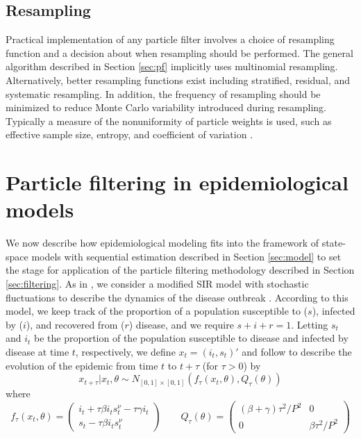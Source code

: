 \documentclass[useAMS,referee,usenatbib]{biom}
\begin{document}
\subsection{Resampling}

Practical implementation of any particle filter involves a choice of resampling function and a decision about when resampling should be performed. The general algorithm described in Section \ref{sec:pf} implicitly uses multinomial resampling. Alternatively, better resampling functions exist including stratified, residual, and systematic resampling. In addition, the frequency of resampling should be minimized to reduce Monte Carlo variability introduced during resampling. Typically a measure of the nonuniformity of particle weights is used, such as effective sample size, entropy, and coefficient of variation \citep{Douc:Capp:Moul:comp:2005}.

\section{Particle filtering in epidemiological models \label{sec:apply}}

We now describe how epidemiological modeling fits into the framework of state-space models with sequential estimation described in Section \ref{sec:model} to set the stage for application of the particle filtering methodology described in Section \ref{sec:filtering}. As in \citet{skvortsov2012monitoring}, we consider a modified SIR model with stochastic fluctuations to describe the dynamics of the disease outbreak \citep{herwaarden1995stochepid, dangerfield2009stochepid, anderson2004sars}.  According to this model, we keep track of the proportion of a population susceptible to ($s$), infected by ($i$), and recovered from ($r$) disease, and we require $s + i + r = 1$.  Letting $s_t$ and $i_t$ be the proportion of the population susceptible to disease and infected by disease at time $t$, respectively, we define $x_t = (i_t,s_t)'$ and follow \citet{skvortsov2012monitoring} to describe the evolution of the epidemic from time $t$ to $t + \tau$ (for $\tau > 0$) by
\begin{equation}
x_{t+\tau}\left|x_t,\theta\right. \sim N_{[0,1]\times[0,1]}\left(f_\tau(x_t,\theta),Q_{\tau}(\theta)\right) \label{eqn:state}
\end{equation}
\noindent where
\[
f_\tau(x_t,\theta) = \left(
\begin{array}{c}
i_t +  \tau\beta i_ts^\nu_t - \tau\gamma i_t \\
s_t - \tau\beta i_ts^{\nu}_t
\end{array}
\right)
\qquad
Q_\tau(\theta) = \left(
\begin{array}{ccccc}
(\beta + \gamma)\tau^2/P^2 & 0 \\
0 & \beta\tau^2/P^2
\end{array}
\right)
\]
\end{document}
